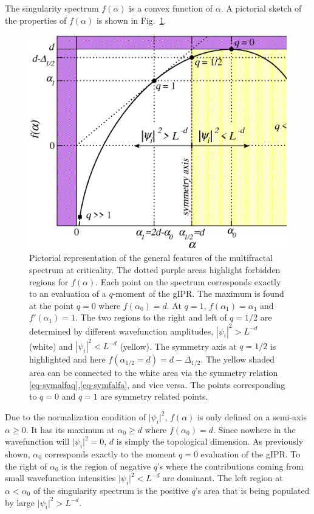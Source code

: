 The singularity spectrum $f(\alpha)$ is a convex function of $\alpha$.  
A pictorial sketch of the properties of $f(\alpha)$ is shown in Fig.~\ref{fig-sexyfalfa}.
%
\begin{figure}
 	\includegraphics[width=\figwidth]{fig-sexyfalfa.eps}
	\caption[Pictorial representation of the general features of the multifractal spectrum at criticality.]{Pictorial representation of the general features of the multifractal spectrum at criticality. The dotted purple areas highlight forbidden regions for $f(\alpha)$.
		Each point on the spectrum corresponds exactly to an evaluation of a $q$-moment of the gIPR.
		The maximum is found at the point $q=0$ where $f(\alpha_0)=d$.  At $q=1$, $f(\alpha_1)=\alpha_1$ and $f'(\alpha_1)=1$.
		The two regions to the right and left of $q=1/2$ are determined by different  wavefunction amplitudes, $|\psi_i|^2 > L^{-d}$ (white) and $|\psi_i|^2<L^{-d}$ (yellow).
                The symmetry axis at $q=1/2$ is highlighted and here $f(\alpha_{1/2}=d)=d-\Delta_{1/2}$.
		The yellow shaded area can be connected to the white area via the symmetry relation \eqref{eq-symalfaq},\eqref{eq-symfalfa}, and vice versa.
		The points corresponding to $q=0$ and $q=1$ are symmetry related points.}
	\label{fig-sexyfalfa}
\end{figure}
%
Due to the normalization condition of $\vert\psi_i\vert^2$, $f(\alpha)$ is only defined on a semi-axis $\alpha\geq0$.  It has its maximum at $\alpha_0 \geqslant d$ where $f(\alpha_0)=d$.  Since nowhere in the wavefunction will $\vert\psi_i\vert^2=0$, $d$ is simply the topological dimension.  As previously shown, $\alpha_0$ corresponds exactly to the moment $q=0$ evaluation of the gIPR.  To the right of $\alpha_0$ is the region of negative $q$'s where the contributions coming from small wavefunction intensities $\vert\psi_i\vert^2<L^{-d}$ are dominant.  The left region at $\alpha<\alpha_0$ of the singularity spectrum is the positive $q$'s area that is being populated by large $\vert\psi_i\vert^2>L^{-d}$.
